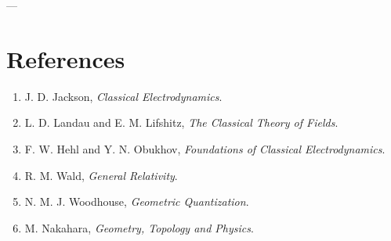\documentclass[12pt]{article}
\begin{document}
---

\section*{References}

\begin{enumerate}
\item J. D. Jackson, \textit{Classical Electrodynamics}.
\item L. D. Landau and E. M. Lifshitz, \textit{The Classical Theory of Fields}.
\item F. W. Hehl and Y. N. Obukhov, \textit{Foundations of Classical Electrodynamics}.
\item R. M. Wald, \textit{General Relativity}.
\item N. M. J. Woodhouse, \textit{Geometric Quantization}.
\item M. Nakahara, \textit{Geometry, Topology and Physics}.
\end{enumerate}
\end{document}

